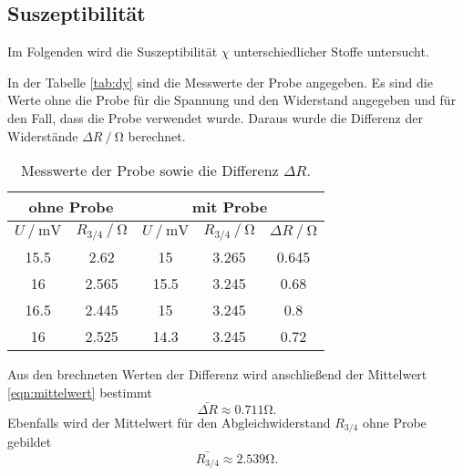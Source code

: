 \subsection{Suszeptibilität}
Im Folgenden wird die Suszeptibilität $\chi$ unterschiedlicher Stoffe untersucht.

In der Tabelle \eqref{tab:dy} sind die Messwerte der Probe  angegeben. Es sind die 
Werte ohne die Probe für die Spannung und den Widerstand angegeben und für den Fall, dass die Probe
verwendet wurde. Daraus wurde die Differenz der Widerstände $\Delta R\mathbin{/}\si{\ohm}$ berechnet.

\begin{table}
  \centering
  \caption{Messwerte der Probe  sowie die Differenz $\Delta R$.}
  \label{tab:dy}
\begin{tabular}{c c | c c | c}
  \hline
  \multicolumn{2}{c}{ohne Probe} & \multicolumn{3}{c}{mit Probe} \\
  \hline
  $U\mathbin{/} \si{\mV}$ & $R_{3/4}\mathbin{/} \si{\ohm}$ & $U\mathbin{/} \si{\mV}$ & $R_{3/4}\mathbin{/} \si{\ohm}$ & $\Delta R\mathbin{/}\si{\ohm}$ \\
  \hline
  15.5  & 2.62 & 15    & 3.265 & 0.645\\
  16  & 2.565 & 15.5   & 3.245 & 0.68\\
  16.5 & 2.445 & 15   & 3.245 & 0.8\\
  16  & 2.525 & 14.3   & 3.245 & 0.72\\
  \bottomrule
  \end{tabular}
\end{table}

Aus den brechneten Werten der Differenz wird anschließend der Mittelwert \eqref{eqn:mittelwert} bestimmt
\begin{equation*}
  \bar{\Delta R} \approx 0.711 \si{\ohm}.
\end{equation*}
Ebenfalls wird der Mittelwert für den Abgleichwiderstand $R_{3/4}$ ohne Probe gebildet
\begin{equation*}
  \bar{R_{3/4}} \approx 2.539 \si{\ohm}.
\end{equation*}

